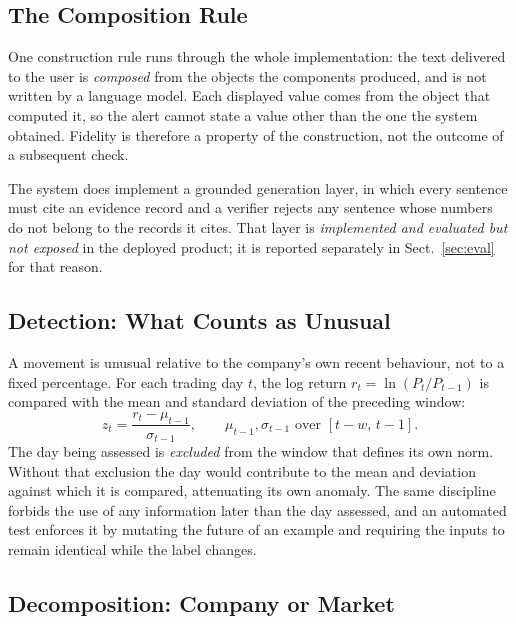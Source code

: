 \documentclass[runningheads]{llncs}
\begin{document}
\subsection{The Composition Rule}

One construction rule runs through the whole implementation: the text delivered to the user
is \emph{composed} from the objects the components produced, and is not written by a
language model. Each displayed value comes from the object that computed it, so the alert
cannot state a value other than the one the system obtained. Fidelity is therefore a
property of the construction, not the outcome of a subsequent check.

The system does implement a grounded generation layer, in which every sentence must cite an
evidence record and a verifier rejects any sentence whose numbers do not belong to the
records it cites. That layer is \emph{implemented and evaluated but not exposed} in the
deployed product; it is reported separately in Sect.~\ref{sec:eval} for that reason.

\subsection{Detection: What Counts as Unusual}

A movement is unusual relative to the company's own recent behaviour, not to a fixed
percentage. For each trading day $t$, the log return $r_t = \ln(P_t / P_{t-1})$ is compared
with the mean and standard deviation of the preceding window:
\begin{equation}
z_t = \frac{r_t - \mu_{t-1}}{\sigma_{t-1}},
\qquad
\mu_{t-1}, \sigma_{t-1} \text{ over } [t-w,\, t-1].
\label{eq:zscore}
\end{equation}
The day being assessed is \emph{excluded} from the window that defines its own norm.
Without that exclusion the day would contribute to the mean and deviation against which it
is compared, attenuating its own anomaly. The same discipline forbids the use of any
information later than the day assessed, and an automated test enforces it by mutating the
future of an example and requiring the inputs to remain identical while the label changes.

\subsection{Decomposition: Company or Market}
\end{document}
